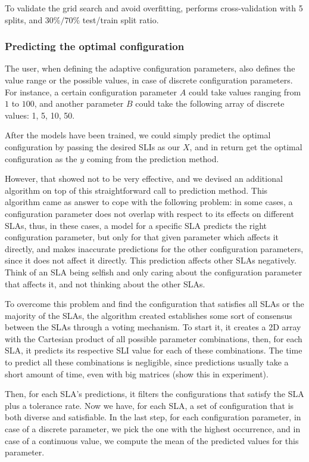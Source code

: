 To validate the grid search and avoid overfitting, \projectname{} performs cross-validation with 5 splits, and $30\%\slash70\%$ test/train split ratio.

\subsubsection{Predicting the optimal configuration}

The user, when defining the adaptive configuration parameters, also defines the value range or the possible values, in case of discrete configuration parameters. For instance, a certain configuration parameter $A$ could take values ranging from $1$ to $100$, and another parameter $B$ could take the following array of discrete values: 1, 5, 10, 50.

After the models have been trained, we could simply predict the optimal configuration by passing the desired SLIs as our $X$, and in return get the optimal configuration as the $y$ coming from the prediction method.

However, that showed not to be very effective, and we devised an additional algorithm on top of this straightforward call to prediction method. This algorithm came as answer to cope with the following problem: in some cases, a configuration parameter does not overlap with respect to its effects on different SLAs, thus, in these cases, a model for a specific SLA predicts the right configuration parameter, but only for that given parameter which affects it directly, and makes inaccurate predictions for the other configuration parameters, since it does not affect it directly. This prediction affects other SLAs negatively. Think of an SLA being selfish and only caring about the configuration parameter that affects it, and not thinking about the other SLAs.

To overcome this problem and find the configuration that satisfies all SLAs or the majority of the SLAs, the algorithm created establishes some sort of consensus between the SLAs through a voting mechanism. To start it, it creates a 2D array with the Cartesian product of all possible parameter combinations, then, for each SLA, it predicts its respective SLI value for each of these combinations. The time to predict all these combinations is negligible, since predictions usually take a short amount of time, even with big matrices (show this in experiment).

Then, for each SLA's predictions, it filters the configurations that satisfy the SLA plus a tolerance rate. Now we have, for each SLA, a set of configuration that is both diverse and satisfiable. In the last step, for each configuration parameter, in case of a discrete parameter, we pick the one with the highest occurrence, and in case of a continuous value, we compute the mean of the predicted values for this parameter.

